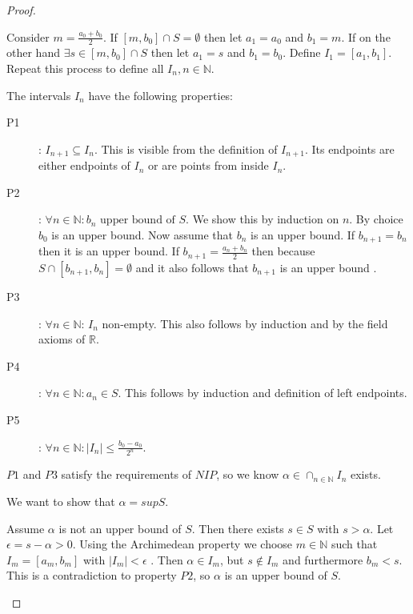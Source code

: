\begin{proof}
\begin{proofpart}
Consider $m=\frac{a_0 + b_0}{2}$. If $[m, b_0] \cap S = \emptyset$ then let $a_1=a_0$ and $b_1=m$. If on the other hand $\exists s \in [m, b_0] \cap S$ then let $a_1=s$ and $b_1=b_0$. Define $I_1=[a_1, b_1]$. Repeat this process to define all $I_n, n \in \mathbb{N}$.

The intervals $I_n$ have the following properties:

\begin{description}
\item[P1]: $I_{n+1} \subseteq I_n$. This is visible from the definition of $I_{n+1}$. Its endpoints are either endpoints of $I_n$ or are points from inside $I_n$.

\item[P2]: $\forall n \in \mathbb{N}: b_n \text{ upper bound of } S$. We show this by induction on $n$. By choice $b_0$ is an upper bound. Now assume that $b_n$ is an upper bound. If $b_{n+1}=b_n$ then it is an upper bound. If $b_{n+1}=\frac{a_n + b_n}{2}$ then because $S \cap [b_{n+1}, b_n] = \emptyset$ and it also follows that $b_{n+1}$ is an upper bound .

\item[P3]: $\forall n \in \mathbb{N}$: $I_n$ non-empty. This also follows by induction and by the field axioms of $\mathbb{R}$.

\item[P4]: $\forall n \in \mathbb{N}: a_n \in S$. This follows by induction and definition of left endpoints.

\item[P5]: $\forall n \in \mathbb{N}: |I_n| \leq \frac{b_0 - a_0}{2^n}$. 
\end{description}
\end{proofpart}

$P1$ and $P3$ satisfy the requirements of $NIP$, so we know  $\alpha \in \cap_{n \in \mathbb{N}} I_n$ exists.

We want to show that $\alpha = sup S$.

\begin{proofpart}\label{alphasup}
Assume $\alpha$ is not an upper bound of $S$. Then there exists $s \in S$ with $s > \alpha$. Let $\epsilon=s - \alpha > 0$. Using the Archimedean property we choose $m \in \mathbb{N}$ such that $I_m = [a_m, b_m]$ with $|I_m| < \epsilon$ . Then $\alpha \in I_m$, but $s \notin I_m$ and furthermore $b_m < s$. This is a contradiction to property $P2$, so $\alpha$ is an upper bound of $S$.


\end{proofpart}
\end{proof}
